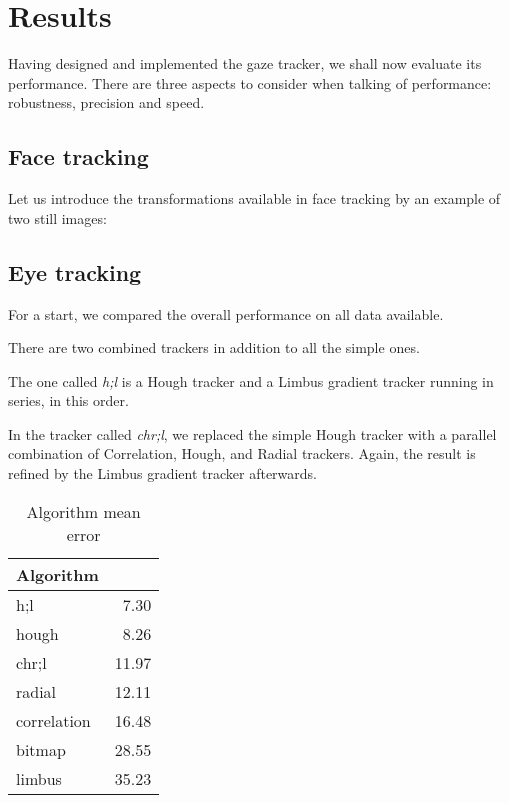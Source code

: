\chapter{Results}
\label{s:results}
Having designed and implemented the gaze tracker, we shall now evaluate its performance.
There are three aspects to consider when talking of performance: robustness, precision and speed.

\section{Face tracking}
Let us introduce the transformations available in face tracking by an example of two still images:


\section{Eye tracking}

For a start, we compared the overall performance on all data available.

There are two combined trackers in addition to all the simple ones.

The one called \textit{h;l} is a Hough tracker and a Limbus gradient tracker running in series, in this order.

In the tracker called \textit{chr;l}, we replaced the simple Hough tracker with a parallel combination of Correlation, Hough, and Radial trackers.
Again, the result is refined by the Limbus gradient tracker afterwards.

\begin{table}[h]
\centering
\begin{tabular}{l@{\hspace{1.5cm}}D{.}{.}{3.2}}
\toprule
\textbf{Algorithm} &  \\
\midrule
h;l & 7.30 \\
hough & 8.26 \\
chr;l & 11.97 \\
radial & 12.11 \\
correlation & 16.48 \\
bitmap & 28.55 \\
limbus & 35.23 \\
\bottomrule
\end{tabular}
\caption{Algorithm mean error}\label{t:algo-mean}
\end{table}

